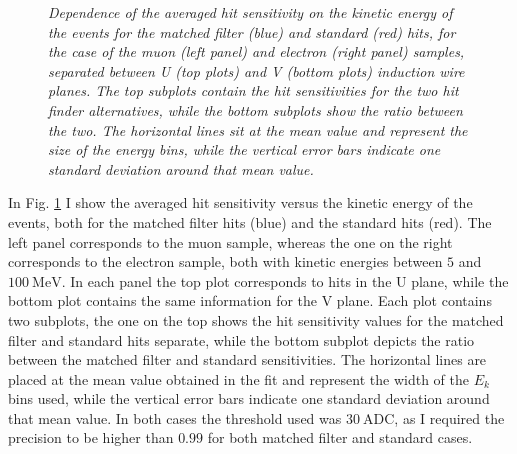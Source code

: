 \begin{figure}[t]
\begin{subfigure}{0.5\textwidth}
	\end{subfigure}
	\caption{\textit{Dependence of the averaged hit sensitivity on the kinetic energy of the events for the matched filter (blue) and standard (red) hits, for the case of the muon (left panel) and electron (right panel) samples, separated between U (top plots) and V (bottom plots) induction wire planes. The top subplots contain the hit sensitivities for the two hit finder alternatives, while the bottom subplots show the ratio between the two. The horizontal lines sit at the mean value and represent the size of the energy bins, while the vertical error bars indicate one standard deviation around that mean value.}}
	\label{fig:sensitivity_energy}
\end{figure}

In Fig. \ref{fig:sensitivity_energy} I show the averaged hit sensitivity versus the kinetic energy of the events, both for the matched filter hits (blue) and the standard hits (red). The left panel corresponds to the muon sample, whereas the one on the right corresponds to the electron sample, both with kinetic energies between $5$ and $100 \ \mathrm{MeV}$. In each panel the top plot corresponds to hits in the U plane, while the bottom plot contains the same information for the V plane. Each plot contains two subplots, the one on the top shows the hit sensitivity values for the matched filter and standard hits separate, while the bottom subplot depicts the ratio between the matched filter and standard sensitivities. The horizontal lines are placed at the mean value obtained in the fit and represent the width of the $E_{k}$ bins used, while the vertical error bars indicate one standard deviation around that mean value. In both cases the threshold used was $30 \ \mathrm{ADC}$, as I required the precision to be higher than $0.99$ for both matched filter and standard cases.

